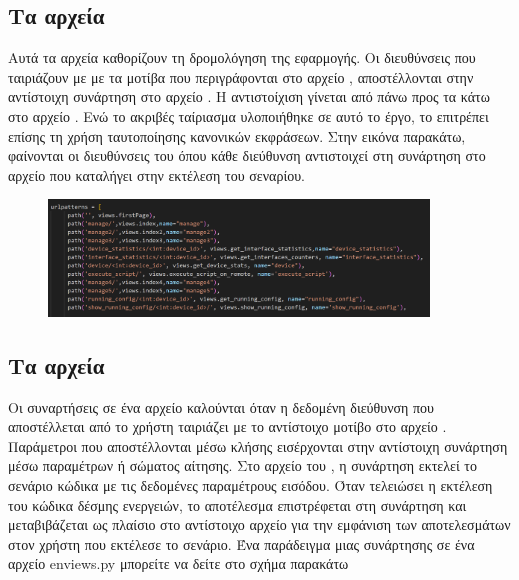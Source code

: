\subsection{Τα αρχεία }
Αυτά τα αρχεία καθορίζουν τη δρομολόγηση  της εφαρμογής. Οι διευθύνσεις  που ταιριάζουν με
με τα μοτίβα  που περιγράφονται στο αρχείο , αποστέλλονται στην αντίστοιχη
συνάρτηση στο αρχείο . Η αντιστοίχιση γίνεται από πάνω προς τα κάτω στο αρχείο
. Ενώ το ακριβές ταίριασμα  υλοποιήθηκε σε αυτό το έργο,
το  επιτρέπει επίσης τη χρήση ταυτοποίησης κανονικών εκφράσεων. Στην εικόνα παρακάτω,
φαίνονται οι διευθύνσεις  του  όπου κάθε διεύθυνση  αντιστοιχεί στη συνάρτηση στο αρχείο
 που καταλήγει στην εκτέλεση του σεναρίου.

\begin{figure}[htb]
	\centering
	\includegraphics[width=0.9\textwidth]{graphics/urlpy.png}
	\caption{ }
\end{figure}

\subsection{Τα αρχεία }

Οι συναρτήσεις σε ένα αρχείο  καλούνται όταν η δεδομένη διεύθυνση  που αποστέλλεται από το
χρήστη ταιριάζει με το αντίστοιχο μοτίβο  στο αρχείο . Παράμετροι που αποστέλλονται μέσω κλήσης
 εισέρχονται στην αντίστοιχη συνάρτηση μέσω παραμέτρων ή σώματος αίτησης. Στο αρχείο  του , η συνάρτηση εκτελεί το σενάριο
κώδικα με τις δεδομένες παραμέτρους εισόδου. Όταν τελειώσει η εκτέλεση του κώδικα δέσμης ενεργειών,
το αποτέλεσμα επιστρέφεται στη συνάρτηση  και μεταβιβάζεται ως πλαίσιο στο αντίστοιχο αρχείο  για την εμφάνιση των αποτελεσμάτων στον χρήστη που εκτέλεσε το σενάριο.
Ένα παράδειγμα μιας συνάρτησης σε ένα αρχείο en{views.py} μπορείτε να δείτε στο σχήμα παρακάτω

